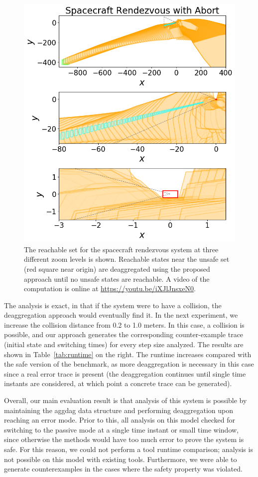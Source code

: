 \begin{figure}[t]
\centerline{\includegraphics[width=0.8\columnwidth]{images/rendezvous.png}}
\vspace{-0.2cm}
\caption{{ The reachable set for the spacecraft rendezvous system at three different zoom levels is shown.
  Reachable states near the unsafe set (red square near origin) are deaggregated using the proposed approach until no unsafe states are reachable.
A video of the computation is online at \url{https://youtu.be/iXJlJnsxeN0}.}}
\label{fig:rendezvous}
\end{figure}

The analysis is exact, in that if the system were to have a collision, the deaggregation approach would eventually find it.
%
In the next experiment, we increase the collision distance from 0.2 to 1.0 meters.
%
In this case, a collision is possible, and our approach generates the corresponding counter-example trace (initial state and switching times)
for every step size analyzed.
%
The results are shown in Table~\ref{tab:runtime} on the right.
%
The runtime increases compared with the safe version of the benchmark, as more deaggregation is necessary in this case since a real error trace is
present (the deaggregation continues until single time instants are considered, at which point a concrete trace can be generated).

Overall, our main evaluation result is that analysis of this system is possible by maintaining the aggdag data structure and
performing deaggregation upon reaching an error mode.
%
Prior to this, all analysis on this model checked for switching to the passive mode at a single time instant or small time window, since otherwise the methods would have too much error to prove the system is safe.
%
For this reason, we could not perform a tool runtime comparison; analysis is not possible on this model with existing tools.
%
Furthermore, we were able to generate counterexamples in the cases where the safety property was violated.
